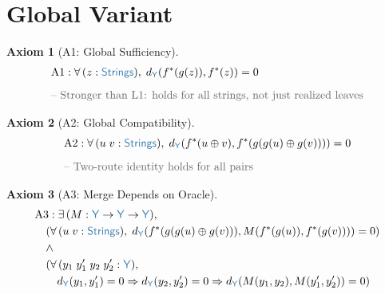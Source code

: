 \documentclass[11pt]{article}
\theoremstyle{definition}
\newtheorem{axiomenv}{Axiom}
\theoremstyle{plain}
\newcommand{\ty}[1]{\textcolor{type}{\mathsf{#1}}}
\newcommand{\fn}[1]{\mathrm{#1}}
\newcommand{\cmt}[1]{\textcolor{comment}{\text{-- #1}}}
\newcommand{\all}{\forall\,}
\newcommand{\ex}{\exists\,}
\newcommand{\arr}{\to}
\newcommand{\Arr}{\Rightarrow}
\newcommand{\Strings}{\ty{Strings}}
\newcommand{\Y}{\ty{Y}}
\newcommand{\fstar}{f^*}
\newcommand{\dY}{d_{\Y}}
\newcommand{\concat}{\oplus}
\begin{document}
\section{Global Variant}
\label{sec:global}

\begin{axiomenv}[A1: Global Sufficiency]
\label{ax:A1}
\begin{align*}
&\fn{A1} : \all (z : \Strings),\; \dY(\fstar(g(z)), \fstar(z)) = 0 \\[6pt]
&\cmt{Stronger than L1: holds for all strings, not just realized leaves}
\end{align*}
\end{axiomenv}

\begin{axiomenv}[A2: Global Compatibility]
\label{ax:A2}
\begin{align*}
&\fn{A2} : \all (u\; v : \Strings),\; \dY(\fstar(u \concat v), \fstar(g(g(u) \concat g(v)))) = 0 \\[6pt]
&\cmt{Two-route identity holds for all pairs}
\end{align*}
\end{axiomenv}

\begin{axiomenv}[A3: Merge Depends on Oracle]
\label{ax:A3}
\begin{align*}
&\fn{A3} : \ex (M : \Y \arr \Y \arr \Y), \\
&\quad (\all (u\; v : \Strings),\; \dY(\fstar(g(g(u) \concat g(v))), M(\fstar(g(u)), \fstar(g(v)))) = 0) \\
&\quad \land \\
&\quad (\all (y_1\; y_1'\; y_2\; y_2' : \Y), \\
&\quad\quad \dY(y_1, y_1') = 0 \Arr \dY(y_2, y_2') = 0 \Arr \dY(M(y_1, y_2), M(y_1', y_2')) = 0)
\end{align*}
\end{axiomenv}
\end{document}
